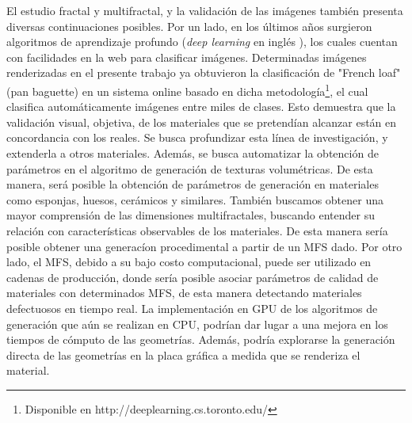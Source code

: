 El estudio fractal y multifractal, y la validación de las imágenes también presenta diversas continuaciones posibles.
Por un lado, en los últimos años surgieron algoritmos de aprendizaje profundo ({\em deep learning} en inglés \cite{Kiros2014}), los cuales cuentan con facilidades en la web para clasificar imágenes.
Determinadas imágenes renderizadas en el presente trabajo ya obtuvieron la clasificación de "French loaf" (pan baguette) en un sistema online basado en dicha metodología\footnote{Disponible en http://deeplearning.cs.toronto.edu/}, el cual clasifica automáticamente imágenes entre miles de clases.
Esto demuestra que la validación visual, objetiva, de los materiales que se pretendían alcanzar están en concordancia con los reales.
Se busca profundizar esta línea de investigación, y extenderla a otros materiales.
Además, se busca automatizar la obtención de parámetros en el algoritmo de generación de texturas volumétricas.
De esta manera, será posible la obtención de parámetros de generación en materiales como esponjas, huesos, cerámicos y similares.
También buscamos obtener una mayor comprensión de las dimensiones multifractales, buscando entender su relación con características observables de los materiales.
De esta manera sería posible obtener una generacíon procedimental a partir de un MFS dado.
Por otro lado, el MFS, debido a su bajo costo computacional,  puede ser utilizado en cadenas de producción, donde sería posible asociar parámetros de calidad de materiales con determinados MFS, de esta manera detectando materiales defectuosos en tiempo real.
La implementación en GPU de los algoritmos de generación que aún se realizan en CPU, podrían dar lugar a una mejora en los tiempos de cómputo de las geometrías.
Además, podría explorarse la generación directa de las geometrías en la placa gráfica a medida que se renderiza el material.

